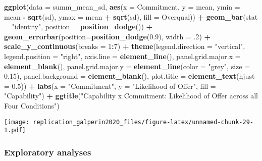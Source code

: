 \documentclass[]{article}
\newenvironment{Shaded}{\begin{snugshade}}{\end{snugshade}}
\newcommand{\DataTypeTok}[1]{\textcolor[rgb]{0.13,0.29,0.53}{#1}}
\newcommand{\DecValTok}[1]{\textcolor[rgb]{0.00,0.00,0.81}{#1}}
\newcommand{\FloatTok}[1]{\textcolor[rgb]{0.00,0.00,0.81}{#1}}
\newcommand{\KeywordTok}[1]{\textcolor[rgb]{0.13,0.29,0.53}{\textbf{#1}}}
\newcommand{\NormalTok}[1]{#1}
\newcommand{\OperatorTok}[1]{\textcolor[rgb]{0.81,0.36,0.00}{\textbf{#1}}}
\newcommand{\StringTok}[1]{\textcolor[rgb]{0.31,0.60,0.02}{#1}}
\begin{document}
\begin{Shaded}
\begin{Highlighting}[]
\KeywordTok{ggplot}\NormalTok{(}\DataTypeTok{data =}\NormalTok{ summ_mean_sd, }\KeywordTok{aes}\NormalTok{(}\DataTypeTok{x =}\NormalTok{ Commitment, }\DataTypeTok{y =}\NormalTok{ mean,}
                                \DataTypeTok{ymin =}\NormalTok{ mean }\OperatorTok{-}\StringTok{ }\KeywordTok{sqrt}\NormalTok{(sd), }\DataTypeTok{ymax =}\NormalTok{ mean }\OperatorTok{+}\StringTok{ }\KeywordTok{sqrt}\NormalTok{(sd), }\DataTypeTok{fill =}\NormalTok{ Overqual)) }\OperatorTok{+}
\StringTok{  }\KeywordTok{geom_bar}\NormalTok{(}\DataTypeTok{stat =} \StringTok{"identity"}\NormalTok{, }\DataTypeTok{position =} \KeywordTok{position_dodge}\NormalTok{()) }\OperatorTok{+}
\StringTok{  }\KeywordTok{geom_errorbar}\NormalTok{(}\DataTypeTok{position=}\KeywordTok{position_dodge}\NormalTok{(}\FloatTok{0.9}\NormalTok{), }\DataTypeTok{width =} \FloatTok{.2}\NormalTok{) }\OperatorTok{+}
\StringTok{  }\KeywordTok{scale_y_continuous}\NormalTok{(}\DataTypeTok{breaks =} \DecValTok{1}\OperatorTok{:}\DecValTok{7}\NormalTok{) }\OperatorTok{+}
\StringTok{  }\KeywordTok{theme}\NormalTok{(}\DataTypeTok{legend.direction =} \StringTok{"vertical"}\NormalTok{,}
        \DataTypeTok{legend.position =} \StringTok{"right"}\NormalTok{,}
        \DataTypeTok{axis.line =} \KeywordTok{element_line}\NormalTok{(),}
        \DataTypeTok{panel.grid.major.x =} \KeywordTok{element_blank}\NormalTok{(),}
        \DataTypeTok{panel.grid.major.y =} \KeywordTok{element_line}\NormalTok{(}\DataTypeTok{color =} \StringTok{"grey"}\NormalTok{, }\DataTypeTok{size =} \FloatTok{0.15}\NormalTok{),}
        \DataTypeTok{panel.background =} \KeywordTok{element_blank}\NormalTok{(),}
        \DataTypeTok{plot.title =} \KeywordTok{element_text}\NormalTok{(}\DataTypeTok{hjust =} \FloatTok{0.5}\NormalTok{)) }\OperatorTok{+}
\StringTok{  }\KeywordTok{labs}\NormalTok{(}\DataTypeTok{x =} \StringTok{"Commitment"}\NormalTok{, }\DataTypeTok{y =} \StringTok{"Likelihood of Offer"}\NormalTok{, }\DataTypeTok{fill =} \StringTok{"Capability"}\NormalTok{) }\OperatorTok{+}
\StringTok{  }\KeywordTok{ggtitle}\NormalTok{(}\StringTok{"Capability x Commitment: Likelihood of Offer across all Four Conditions"}\NormalTok{)}
\end{Highlighting}
\end{Shaded}

\texttt{[image: replication\_galperin2020\_files/figure-latex/unnamed-chunk-29-1.pdf]}

\hypertarget{exploratory-analyses}{%
\subsubsection{Exploratory analyses}\label{exploratory-analyses}}
\end{document}
